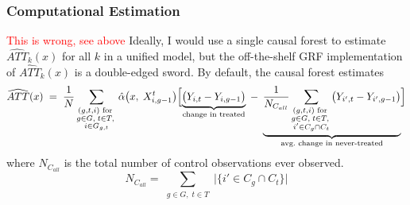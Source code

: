 \documentclass[source/paper/main.tex]{subfiles}
\begin{document}
\subsubsection{Computational Estimation}
\textcolor{red}{This is wrong, see above}
Ideally, I would use a single causal forest to estimate $\widehat{ATT}_{k}(x)$ for all $k$ in a unified model, but the off-the-shelf GRF implementation of $\widehat{ATT}_{k}(x)$ is a double-edged sword. By default, the causal forest estimates
\[
    \widehat{ATT}(x)
    \;=\;
    \frac{1}{N}
    \sum_{\substack{
        (g,t,i) \text{ for } \\
        g \in G,\; t \in T,\; \\
        i \in G_{g,t}
    }}
    \hat{\alpha}\bigl(x,\; X_{i,g-1}^t\bigr)
    \Bigl[
      \underbrace{\bigl(Y_{i,t} - Y_{i,g-1}\bigr)}_{\text{change in treated}}
      \;-\;
      \underbrace{\frac{1}{N_{C_{all}}}
        \sum_{\substack{
            (g,t,i) \text{ for } \\
            g \in G,\; t \in T,\; \\
            i' \in C_g \cap C_t
        }} 
          \bigl(Y_{i',t} - Y_{i',g-1}\bigr)}_{\text{avg.\ change in never-treated}}
    \Bigr] 
\]
where $N_{C_{all}}$ is the total number of control observations ever observed. \[
N_{C_{all}} = \sum_{\substack{
    g \in G,\; t \in T}} \bigl|\{i' \in C_g \cap C_t \}\bigr|
\]
\end{document}

